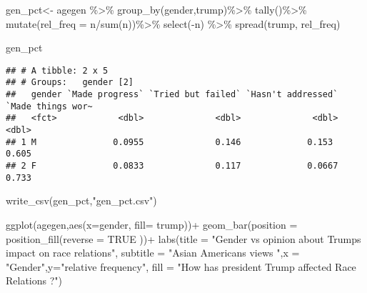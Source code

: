 \documentclass[
]{article}
\newenvironment{Shaded}{\begin{snugshade}}{\end{snugshade}}
\newcommand{\AttributeTok}[1]{\textcolor[rgb]{0.77,0.63,0.00}{#1}}
\newcommand{\ConstantTok}[1]{\textcolor[rgb]{0.00,0.00,0.00}{#1}}
\newcommand{\FunctionTok}[1]{\textcolor[rgb]{0.00,0.00,0.00}{#1}}
\newcommand{\NormalTok}[1]{#1}
\newcommand{\OtherTok}[1]{\textcolor[rgb]{0.56,0.35,0.01}{#1}}
\newcommand{\SpecialCharTok}[1]{\textcolor[rgb]{0.00,0.00,0.00}{#1}}
\newcommand{\StringTok}[1]{\textcolor[rgb]{0.31,0.60,0.02}{#1}}
\begin{document}
\begin{Shaded}
\begin{Highlighting}[]
\NormalTok{gen\_pct}\OtherTok{\textless{}{-}}\NormalTok{ agegen }\SpecialCharTok{\%\textgreater{}\%}
  \FunctionTok{group\_by}\NormalTok{(gender,trump)}\SpecialCharTok{\%\textgreater{}\%}
  \FunctionTok{tally}\NormalTok{()}\SpecialCharTok{\%\textgreater{}\%}
  \FunctionTok{mutate}\NormalTok{(}\AttributeTok{rel\_freq =}\NormalTok{ n}\SpecialCharTok{/}\FunctionTok{sum}\NormalTok{(n))}\SpecialCharTok{\%\textgreater{}\%}
  \FunctionTok{select}\NormalTok{(}\SpecialCharTok{{-}}\NormalTok{n) }\SpecialCharTok{\%\textgreater{}\%}
  \FunctionTok{spread}\NormalTok{(trump, rel\_freq) }

\NormalTok{gen\_pct}
\end{Highlighting}
\end{Shaded}

\begin{verbatim}
## # A tibble: 2 x 5
## # Groups:   gender [2]
##   gender `Made progress` `Tried but failed` `Hasn't addressed` `Made things wor~
##   <fct>            <dbl>              <dbl>              <dbl>             <dbl>
## 1 M               0.0955              0.146             0.153              0.605
## 2 F               0.0833              0.117             0.0667             0.733
\end{verbatim}

\begin{Shaded}
\begin{Highlighting}[]
\FunctionTok{write\_csv}\NormalTok{(gen\_pct,}\StringTok{"gen\_pct.csv"}\NormalTok{)}

\FunctionTok{ggplot}\NormalTok{(agegen,}\FunctionTok{aes}\NormalTok{(}\AttributeTok{x=}\NormalTok{gender, }\AttributeTok{fill=}\NormalTok{ trump))}\SpecialCharTok{+}
  \FunctionTok{geom\_bar}\NormalTok{(}\AttributeTok{position =} \FunctionTok{position\_fill}\NormalTok{(}\AttributeTok{reverse =} \ConstantTok{TRUE}\NormalTok{ ))}\SpecialCharTok{+} 
  \FunctionTok{labs}\NormalTok{(}\AttributeTok{title =} \StringTok{"Gender vs opinion about Trump\textquotesingle{}s impact on race relations"}\NormalTok{,}
       \AttributeTok{subtitle =} \StringTok{"Asian Americans views "}\NormalTok{,}\AttributeTok{x =} \StringTok{"Gender"}\NormalTok{,}\AttributeTok{y=}\StringTok{"relative frequency"}\NormalTok{, }
       \AttributeTok{fill =} \StringTok{"How has president Trump affected Race Relations ?"}\NormalTok{)}
\end{Highlighting}
\end{Shaded}
\end{document}
